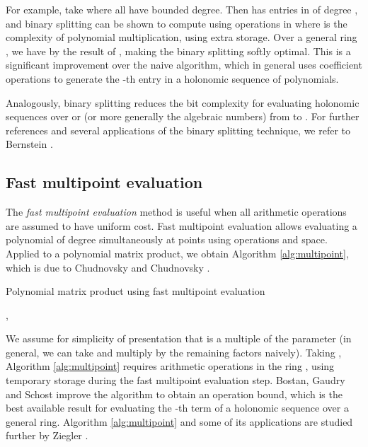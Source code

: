 \documentclass{sig-alternate}
\begin{document}
For example, take  where all 
have bounded degree.
Then  has entries in  of
degree , and binary splitting can be shown to compute
 using  operations in  where
 is the complexity of polynomial multiplication,
using  extra storage.
Over a general ring , we have
 by the result of \cite{CantorKaltofen1991},
making the binary splitting softly optimal.
This is a significant improvement over the naive algorithm, which in general
uses  coefficient operations to generate the -th entry in a
holonomic sequence of polynomials.

Analogously, binary splitting reduces
the bit complexity for evaluating holonomic sequences over  or
 (or more generally the algebraic numbers) from
 to . For further references and
several applications of the binary splitting technique,
we refer to Bernstein \cite{Bernstein2008}.

\subsection{Fast multipoint evaluation}

The \emph{fast multipoint evaluation} method is useful when all
arithmetic operations are assumed to have uniform cost. Fast
multipoint evaluation allows evaluating a polynomial of
degree  simultaneously at  points using 
operations and  space.
Applied to a polynomial matrix product, we obtain
Algorithm \ref{alg:multipoint}, which is due to
Chudnovsky and Chudnovsky \cite{ChudnovskyChudnovsky1988}.

\begin{algorithm}
  \caption{Polynomial matrix product using fast multipoint evaluation}
  \label{alg:multipoint}
  \begin{algorithmic}[1]
    \Require , 
    \Ensure 
    \State 
    \Statex {}
    \State  {}
    \State 
    \Statex {}
    \State \Return{} 
  \end{algorithmic}
\end{algorithm}

We assume for simplicity of presentation
that  is a multiple of the parameter
 (in general, we can take 
and multiply by the remaining factors naively).
Taking ,
Algorithm \ref{alg:multipoint} requires 
arithmetic operations in the ring ,
using  temporary storage
during the fast multipoint evaluation step.
Bostan, Gaudry and Schost \cite{BostanGaudrySchost2007} improve
the algorithm to obtain an 
operation bound, which is the best available result for evaluating the
-th term of a holonomic sequence over a general ring.
Algorithm \ref{alg:multipoint} and some of its applications
are studied further by Ziegler \cite{Ziegler2005}.
\end{document}
